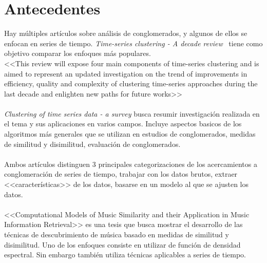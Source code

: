 \documentclass[12pt,oneside]{book}
\begin{document}
\chapter{Antecedentes}
Hay m\'ultiples art\'iculos sobre an\'alisis de conglomerados, y algunos de ellos se enfocan en series de tiempo. \textit{Time-series clustering - A decade review}~\cite{TimeSeries} tiene como objetivo comparar los enfoques m\'as populares.\\
<<This review will expose four main components of time-series clustering and is aimed to represent an updated investigation on the trend of improvements in efficiency, quality and complexity of clustering time-series approaches during the last decade and enlighten new paths for future works>>~\cite{TimeSeries}\\\\

\textit{Clustering of time series data - a survey} busca resumir investigaci\'on realizada en el tema y sus aplicaciones en varios campos. Incluye aspectos basicos de los algoritmos m\'as generales que se utilizan en estudios de conglomerados, medidas de similitud y disimilitud, evaluaci\'on de conglomerados.~\cite{TimeSeries3}\\\\

Ambos art\'iculos distinguen 3 principales categorizaciones de los acercamientos a conglomeraci\'on de series de tiempo, trabajar con los datos brutos, extraer <<caracter\'isticas>> de los datos, basarse en un modelo al que se ajusten los datos. \\\\

<<Computational Models of Music Similarity and their Application in Music Information Retrieval>> es una tesis que busca mostrar el desarrollo de las t\'ecnicas de descubrimiento de m\'usica basado en medidas de similitud y disimilitud. Uno de los enfoques consiste en utilizar de funci\'on de densidad espectral. Sin embargo tambi\'en utiliza t\'ecnicas aplicables a series de tiempo.~\cite{Music}
\end{document}
